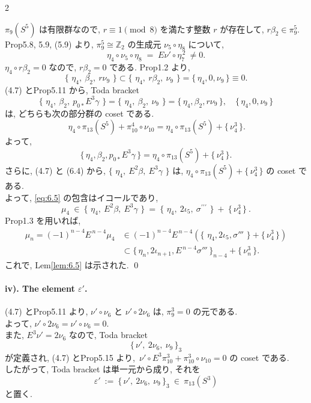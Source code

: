 \documentclass[10pt, leqno]{ltjsarticle}
\newcommand{\toda}[1]{\{\,#1\,\}}              %
\newcommand{\todai}[2][]{\{\,#2\,\}_{#1}}      %
\newcommand{\gen}[1]{\{\,#1\,\}}       %
\newcommand{\pis}[2]{\pi_{#1}(#2)}       %
\newcommand{\pit}[2]{\pi_{#1}^{#2}}
\numberwithin{equation}{section}
\theoremstyle{plain}
\theoremstyle{definition}
\theoremstyle{remark}
\begin{document}
\begin{paracol}{2}

\noindent
\(\pi_{9}(S^{5})\) は有限群なので, 
\(r\equiv1\pmod 8\) を満たす整数 \(r\) が存在して, 
\(r\beta_{2}\in \pi^{5}_{9}\). \\
Prop5.8, 5.9, (5.9) より, 
\(\pi^{5}_{9}\cong\mathbb Z_{2}\) 
の生成元 \(\nu_{5}\circ \eta_{8}\) について,
\[
\eta_{4}\circ \nu_{5}\circ \eta_{8}
  \;=\; E\nu'\circ \eta_{7}^{\,2}\ \ne 0 .
\]
\(\eta_{4}\circ r\beta_{2}=0\) なので,
\(r\beta_{2}=0\) である. 
Prop1.2 より,
\[
\toda{\,\eta_{4},\ \beta_{2},\ r\nu_{9}\,}
\subset \toda{\,\eta_{4},\ r\beta_{2},\ \nu_{9}\,}
= \toda{\eta_4, 0, \nu_9}
\equiv 0 .
\]
(4.7) とProp5.11 から, Toda bracket 
\[
\toda{\,\eta_{4},\ \beta_{2},\ p_{0\ast}E^{3}\gamma\,}
= \toda{\,\eta_{4},\ \beta_{2},\ \nu_{9}\,}
= \toda{\eta_4, \beta_2, r\nu_9},\quad
\toda{\eta_4, 0, \nu_9}
\]
は, どちらも次の部分群の coset である. 
\[
\,\eta_{4}\circ \pi_{13}(S^{5}) + \pit{10}{4}\circ\nu_{10}
= \eta_4\circ\pis{13}{S^5} + \gen{\nu^{3}_{4}} .
\] 
よって,
\[
\toda{\eta_4, \beta_2, p_{0*}E^3\gamma}
=\eta_4\circ\pis{13}{S^5} + \gen{\nu_4^3}.
\]
さらに, (4.7) と (6.4) から,
\(\toda{\,\eta_{4},\ E^{2}\beta,\ E^{3}\gamma\,}\)
は, 
\(\eta_{4}\circ \pi_{13}(S^{5})
+\gen{\nu^{3}_{4}}\) の coset である. \\
よって, \eqref{eq:6.5} の包含はイコールであり, 
\[
\mu_{4}\ \in\ \toda{\,\eta_{4},\ E^{2}\beta,\ E^{3}\gamma\,}
 \ =\ \toda{\,\eta_{4},\ 2\iota_{5},\ \sigma^{\prime\prime\prime}\,}\ +\ \gen{\nu^{3}_{4}}\ .
\]
Prop1.3 を用いれば,
\[
\begin{align*}
\mu_{n} = (-1)^{n-4}E^{\,n-4}\mu_{4}
& \in (-1)^{n-4}E^{\,n-4}(\toda{\,\eta_{4},2\iota_{5},\sigma'''\,}
  +\gen{\nu^{3}_{4}})\\
& \subset \todai[n-4]{\eta_{n},2\iota_{n+1},E^{\,n-4}\sigma'''}
  +\gen{\nu^{3}_{n}} .
\end{align*}
\]
これで, Lem\ref{lem:6.5} は示された. 
\qed

\bigskip
\paragraph{iv). The element \(\varepsilon'\).}

(4.7) とProp5.11 より,
\(\nu'\circ\nu_6\) と \(\nu'\circ2\nu_6\) は,
\(\pit{9}{3} = 0\) の元である. \\
よって, 
\(\nu'\circ 2\nu_{6}=\nu'\circ \nu_{6}=0 .\)\\
また, \(E^{3}\nu'=2\nu_{6}\) なので,  Toda bracket 
\[
\todai[3]{\nu',\ 2\nu_{6},\ \nu_{9}}
\]
が定義され, (4.7) とProp5.15 より,
\(\,\nu'\circ E^{3}\pi^{3}_{10}+\pi^{3}_{10}\circ \nu_{10}=0\) の coset である. \\
したがって, Toda bracket は単一元から成り, それを
\[
\varepsilon'\ :=\ \todai[3]{\nu',\ 2\nu_{6},\ \nu_{9}}
\ \in\ \pi_{13}(S^{3})
\]
と置く. 


\end{paracol}
\end{document}
